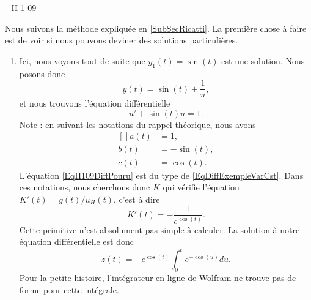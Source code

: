 

\begin{corrige}{_II-1-09}

Nous suivons la méthode expliquée en \ref{SubSecRicatti}. La première chose à faire est de voir si nous pouvons deviner des solutions particulières.

\begin{enumerate}

\item 
Ici, nous voyons tout de suite que $y_1(t)=\sin(t)$ est une solution. Nous posons donc
\begin{equation}
	y(t)=\sin(t)+\frac{1}{ u },
\end{equation}
et nous trouvons l'équation différentielle
\begin{equation}		\label{EqII109DiffPouru}
	u'+\sin(t)u=1.
\end{equation}
Note : en suivant les notations du rappel théorique, nous avons
\begin{equation}
	\begin{aligned}[]
		a(t)	&=1,\\
		b(t)	&=-\sin(t),\\
		c(t)	&=\cos(t).
	\end{aligned}
\end{equation}
L'équation \eqref{EqII109DiffPouru} est du type de \eqref{EqDiffExempleVarCst}. Dans ces notations, nous cherchons donc $K$ qui vérifie l'équation $K'(t)=g(t)/u_H(t)$, c'est à dire
\begin{equation}
	K'(t)=-\frac{ 1 }{  e^{\cos(t)} }.
\end{equation}
Cette primitive n'est absolument pas simple à calculer. La solution à notre équation différentielle est donc 
\begin{equation}
	z(t)=- e^{\cos(t)}\int_0^t e^{-\cos(u)}du.
\end{equation}
Pour la petite histoire, l'\href{http://integrals.wolfram.com/index.jsp}{intégrateur en ligne} de Wolfram \href{http://reference.wolfram.com/mathematica/tutorial/IntegralsThatCanAndCannotBeDone.html}{ne trouve pas} de forme pour cette intégrale.


\end{enumerate}

\end{corrige}
